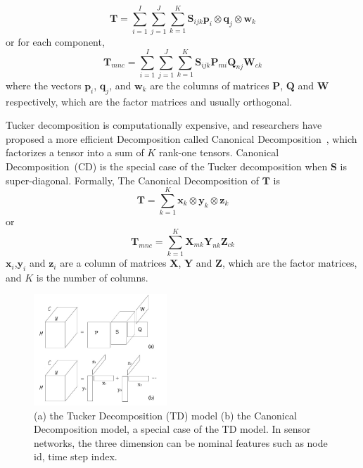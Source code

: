 \begin{equation*}
\mathbf{T}=\sum\limits_{i=1}^{I}\sum\limits_{j=1}^{J}\sum\limits_{k=1}^{K}\mathbf{S}_{ijk}\mathbf{p}_i\otimes \mathbf{q}_j\otimes \mathbf{w}_k
\end{equation*}
or for each component,
\begin{equation*}
\mathbf{T}_{mnc}=\sum\limits_{i=1}^{I}\sum\limits_{j=1}^{J}\sum\limits_{k=1}^{K}\mathbf{S}_{ijk}\mathbf{P}_{m i}\mathbf{Q}_{n j}\mathbf{W}_{c k}
\end{equation*}
where the vectors $\mathbf{p}_i$, $\mathbf{q}_j$, and $\mathbf{w}_k$ are the columns of matrices $\mathbf{P}$, $\mathbf{Q}$ and $\mathbf{W}$ respectively, which are the factor matrices and usually orthogonal.


Tucker decomposition is computationally expensive, and researchers have proposed a more efficient Decomposition called Canonical Decomposition~\cite{carroll1970analysis}, which factorizes a tensor into a sum of $K$ rank-one tensors.
Canonical Decomposition~(CD) is the special case of the Tucker decomposition when $\mathbf{S}$ is super-diagonal.
Formally, The Canonical Decomposition of $\mathbf{T}$ is
\begin{equation*}
\mathbf{T}=\sum\limits_{k=1}^{K}\mathbf{x}_k\otimes \mathbf{y}_k\otimes \mathbf{z}_k
\end{equation*}
or
\begin{equation*}
\mathbf{T}_{mnc}=\sum\limits_{k=1}^{K}\mathbf{X}_{m k} \mathbf{Y}_{n k} \mathbf{Z}_{c k}
\end{equation*}
$\mathbf{x}_i$,$\mathbf{y}_i$ and $\mathbf{z}_i$ are a column of matrices $\mathbf{X}$, $\mathbf{Y}$ and $\mathbf{Z}$, which are the factor matrices, and $K$ is the number of columns. 

\begin{figure}[h] 
\includegraphics[width=5cm]{tf.jpg} 
\caption{ (a) the Tucker Decomposition (TD) model (b) the Canonical Decomposition model, a special case of the TD model. In sensor networks, the three dimension can be nominal features such as node id, time step index.} 
\label{fig:tf:tuckcanon} 
\end{figure}

